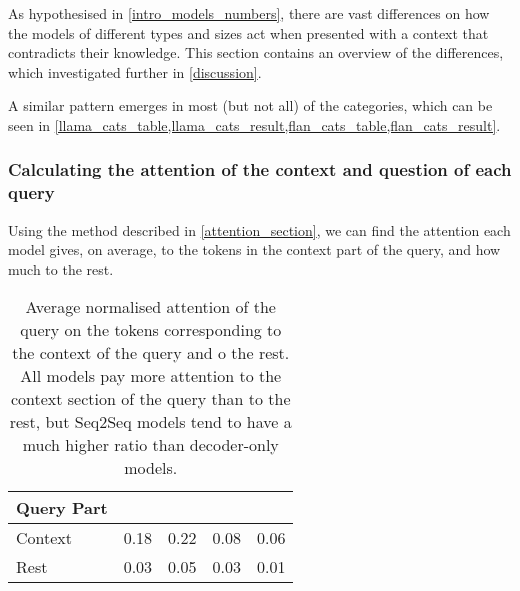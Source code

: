 As hypothesised in \cref{intro_models_numbers}, there are vast differences on how the models of different types and sizes act when presented with a context that contradicts their knowledge.
This section contains an overview of the differences, which investigated further in \cref{discussion}.

A similar pattern emerges in most (but not all) of the categories, which can be seen in \cref{llama_cats_table,llama_cats_result,flan_cats_table,flan_cats_result}.

\subsubsection{Calculating the attention of the context and question of each query}
\label{attention_results}

Using the method described in \cref{attention_section}, we can find the attention each model gives, on average, to the tokens in the context part of the query, and how much to the rest.

\begin{table}[h]
	\centering
	\scriptsize
	\begin{tabular}{l | r r r r}
		\toprule
			Query Part & \smallflan{} & \bigflan{} & \llamaparbox{} & \bigllamaparbox{} \\
		\midrule
			Context & 0.18 & 0.22 & 0.08 & 0.06 \\
			Rest & 0.03 & 0.05 & 0.03 & 0.01 \\
		\bottomrule
	\end{tabular}
	\caption{Average normalised attention of the query on the tokens corresponding to the context of the query and o the rest. All models pay more attention to the context section of the query than to the rest, but Seq2Seq models tend to have a much higher ratio than decoder-only models.}
	\label{attention_table}
\end{table}

